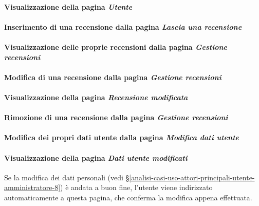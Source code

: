 \paragraph{Visualizzazione della pagina \textit{Utente}}
\label{analisi-casi-uso-attori-principali-utente-autenticato-2}

\paragraph{Inserimento di una recensione dalla pagina \textit{Lascia una recensione}}
\label{analisi-casi-uso-attori-principali-utente-autenticato-3}

\paragraph{Visualizzazione delle proprie recensioni dalla pagina \textit{Gestione recensioni}}
\label{analisi-casi-uso-attori-principali-utente-autenticato-4}

\paragraph{Modifica di una recensione dalla pagina \textit{Gestione recensioni}}
\label{analisi-casi-uso-attori-principali-utente-autenticato-5}

\paragraph{Visualizzazione della pagina \textit{Recensione modificata}}
\label{analisi-casi-uso-attori-principali-utente-autenticato-6}

\paragraph{Rimozione di una recensione dalla pagina \textit{Gestione recensioni}}
\label{analisi-casi-uso-attori-principali-utente-autenticato-7}

\paragraph{Modifica dei propri dati utente dalla pagina \textit{Modifica dati utente}}
\label{analisi-casi-uso-attori-principali-utente-autenticato-8}

\paragraph{Visualizzazione della pagina \textit{Dati utente modificati}}
\label{analisi-casi-uso-attori-principali-utente-autenticato-9}
Se la modifica dei dati personali (vedi §\ref{analisi-casi-uso-attori-principali-utente-amministratore-8}) è andata a buon fine, l'utente viene indirizzato automaticamente a questa pagina, che conferma la modifica appena effettuata.

